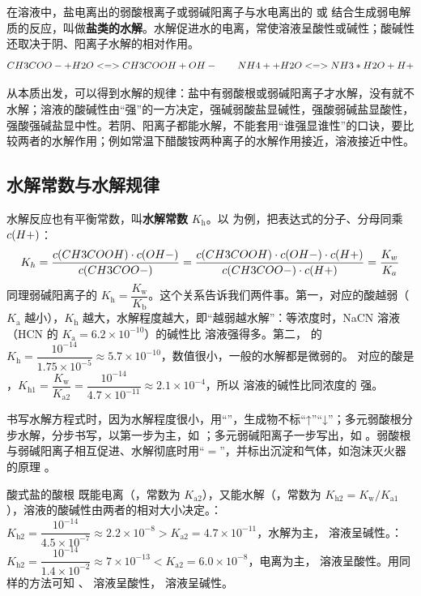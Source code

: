 \begin{gainian}[盐类的水解]
在溶液中，盐电离出的弱酸根离子或弱碱阳离子与水电离出的  或  结合生成弱电解质的反应，叫做\textbf{盐类的水解}。水解促进水的电离，常使溶液呈酸性或碱性；酸碱性还取决于阴、阳离子水解的相对作用。
\[CH3COO- + H2O <=> CH3COOH + OH-\qquad NH4+ + H2O <=> NH3*H2O + H+\]
\end{gainian}

从本质出发，可以得到水解的规律：盐中有弱酸根或弱碱阳离子才水解，没有就不水解；溶液的酸碱性由“强”的一方决定，强碱弱酸盐显碱性，强酸弱碱盐显酸性，强酸强碱盐显中性。若阴、阳离子都能水解，不能套用“谁强显谁性”的口诀，要比较两者的水解作用；例如常温下醋酸铵两种离子的水解作用接近，溶液接近中性。

\subsection{水解常数与水解规律}
水解反应也有平衡常数，叫\textbf{水解常数} $K_\text{h}$。以  为例，把表达式的分子、分母同乘 $c(H+)$：
\[K_h=\frac{c(CH3COOH)\cdot c(OH-)}{c(CH3COO-)}=\frac{c(CH3COOH)\cdot c(OH-)\cdot c(H+)}{c(CH3COO-)\cdot c(H+)}=\frac{K_w}{K_a}\]
同理弱碱阳离子的 $K_\text{h}=\dfrac{K_\text{w}}{K_\text{b}}$。这个关系告诉我们两件事。第一，对应的酸越弱（$K_\text{a}$ 越小），$K_\text{h}$ 越大，水解程度越大，即“越弱越水解”：等浓度时，NaCN 溶液（HCN 的 $K_\text{a}=6.2\times10^{-10}$）的碱性比  溶液强得多。第二， 的 $K_\text{h}=\dfrac{10^{-14}}{1.75\times10^{-5}}\approx5.7\times10^{-10}$，数值很小，一般的水解都是微弱的。 对应的酸是 ，$K_\text{h1}=\dfrac{K_\text{w}}{K_{\text{a}2}}=\dfrac{10^{-14}}{4.7\times10^{-11}}\approx2.1\times10^{-4}$，所以  溶液的碱性比同浓度的  强。

书写水解方程式时，因为水解程度很小，用“\ce{<=>}”，生成物不标“↑”“↓”；多元弱酸根分步水解，分步书写，以第一步为主，如 ；多元弱碱阳离子一步写出，如 。弱酸根与弱碱阳离子相互促进、水解彻底时用“$=$”，并标出沉淀和气体，如泡沫灭火器的原理 。

酸式盐的酸根  既能电离（，常数为 $K_{\text{a}2}$），又能水解（，常数为 $K_\text{h2}=K_\text{w}/K_{\text{a}1}$），溶液的酸碱性由两者的相对大小决定。：$K_\text{h2}=\dfrac{10^{-14}}{4.5\times10^{-7}}\approx2.2\times10^{-8}>K_{\text{a}2}=4.7\times10^{-11}$，水解为主， 溶液呈碱性。：$K_\text{h2}=\dfrac{10^{-14}}{1.4\times10^{-2}}\approx7\times10^{-13}<K_{\text{a}2}=6.0\times10^{-8}$，电离为主， 溶液呈酸性。用同样的方法可知 、 溶液呈酸性， 溶液呈碱性。

